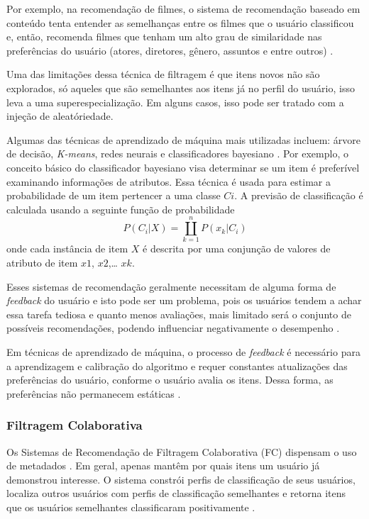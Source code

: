 Por exemplo, na recomendação de filmes, o sistema de recomendação baseado em conteúdo 
tenta entender as semelhanças entre os filmes que o usuário classificou e, então, recomenda filmes 
que tenham um alto grau de similaridade nas preferências do usuário (atores, diretores, gênero, assuntos e entre outros) \cite{adomavicius2005}.

Uma das limitações dessa técnica de filtragem é que itens novos não são explorados, só aqueles que são semelhantes 
aos itens já no perfil do usuário, isso leva a uma superespecialização. Em alguns casos, isso pode ser tratado com a 
injeção de aleatóriedade\cite{paulson2003}.


Algumas das técnicas de aprendizado de máquina mais utilizadas incluem: árvore de decisão, \emph{K-means}, redes neurais e classificadores 
bayesiano \cite{son2017}. Por exemplo, o conceito básico do classificador bayesiano visa determinar se um item é preferível examinando informações de 
atributos. Essa técnica é usada para estimar a probabilidade de um item 
pertencer a uma classe $Ci$. A previsão de classificação é calculada usando a 
seguinte função de probabilidade
\begin{equation}
	P(C_{i}|X) = \coprod _{k=1}^{n} P(x_{k}|C_{i})
\end{equation}
onde cada instância de item $X$ é descrita por uma conjunção de valores de atributo de item $x1$, $x2$,… $xk$. 


Esses sistemas de recomendação geralmente necessitam de alguma forma de \emph{feedback} do usuário e isto pode ser 
um problema, pois os usuários tendem a achar essa tarefa tediosa e quanto menos avaliações, mais limitado 
será o conjunto de possíveis recomendações, podendo influenciar negativamente o desempenho \cite{paulson2003}. 

Em técnicas de aprendizado de máquina, o processo de \emph{feedback} é necessário para a aprendizagem e calibração 
do algoritmo e requer constantes atualizações das preferências do usuário, conforme o usuário avalia os itens. Dessa forma, 
as preferências não permanecem estáticas \cite{paulson2003}. 



\subsubsection{Filtragem Colaborativa}

Os Sistemas de Recomendação de Filtragem Colaborativa (FC) dispensam o uso de metadados \cite{mauricio}. 
Em geral, apenas mantêm por quais itens um usuário já demonstrou interesse. O sistema constrói perfis de classificação 
de seus usuários, localiza outros usuários com perfis de classificação 
semelhantes e retorna itens que os usuários semelhantes classificaram 
positivamente \cite{son2017}.

